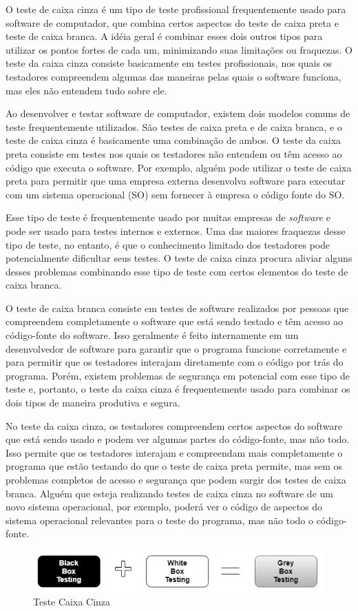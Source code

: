 O teste de caixa cinza é um tipo de teste profissional frequentemente usado para software de computador, que combina certos aspectos do teste de caixa preta e teste de caixa branca. A idéia geral é combinar esses dois outros tipos para utilizar os pontos fortes de cada um, minimizando suas limitações ou fraquezas. O teste da caixa cinza consiste basicamente em testes profissionais, nos quais os testadores compreendem algumas das maneiras pelas quais o software funciona, mas eles não entendem tudo sobre ele.

Ao desenvolver e testar software de computador, existem dois modelos comuns de teste frequentemente utilizados. São testes de caixa preta e de caixa branca, e o teste de caixa cinza é basicamente uma combinação de ambos. O teste da caixa preta consiste em testes nos quais os testadores não entendem ou têm acesso ao código que executa o software. Por exemplo, alguém pode utilizar o teste de caixa preta para permitir que uma empresa externa desenvolva software para executar com um sistema operacional (SO) sem fornecer à empresa o código fonte do SO.

Esse tipo de teste é frequentemente usado por muitas empresas de \textit{software} e pode ser usado para testes internos e externos. Uma das maiores fraquezas desse tipo de teste, no entanto, é que o conhecimento limitado dos testadores pode potencialmente dificultar seus testes. O teste de caixa cinza procura aliviar alguns desses problemas combinando esse tipo de teste com certos elementos do teste de caixa branca.


O teste de caixa branca consiste em testes de software realizados por pessoas que compreendem completamente o software que está sendo testado e têm acesso ao código-fonte do software. Isso geralmente é feito internamente em um desenvolvedor de software para garantir que o programa funcione corretamente e para permitir que os testadores interajam diretamente com o código por trás do programa. Porém, existem problemas de segurança em potencial com esse tipo de teste e, portanto, o teste da caixa cinza é frequentemente usado para combinar os dois tipos de maneira produtiva e segura.

No teste da caixa cinza, os testadores compreendem certos aspectos do software que está sendo usado e podem ver algumas partes do código-fonte, mas não todo. Isso permite que os testadores interajam e compreendam mais completamente o programa que estão testando do que o teste de caixa preta permite, mas sem os problemas completos de acesso e segurança que podem surgir dos testes de caixa branca. Alguém que esteja realizando testes de caixa cinza no software de um novo sistema operacional, por exemplo, poderá ver o código de aspectos do sistema operacional relevantes para o teste do programa, mas não todo o código-fonte.

\begin{figure}[H]
    \centering
    \includegraphics[width=0.7\linewidth]{dados/figuras/grey}
    \caption{Teste Caixa Cinza}
    \label{fig:teste}
\end{figure}

